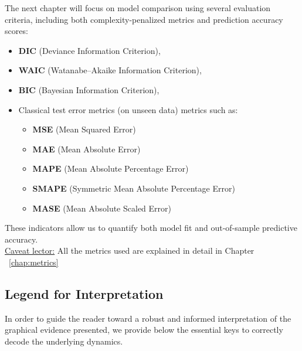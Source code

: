 \documentclass{Configuration_Files/PoliMi3i_thesis}
\begin{document}
The next chapter will focus on model comparison using several evaluation criteria, including both complexity-penalized metrics and prediction accuracy scores:
\begin{itemize}
    \item \textbf{DIC} (Deviance Information Criterion),
    \item \textbf{WAIC} (Watanabe–Akaike Information Criterion),
    \item \textbf{BIC} (Bayesian Information Criterion),
    \item Classical test error metrics (on unseen data) metrics such as:
    \begin{itemize}
  \item \textbf{MSE} (Mean Squared Error)
  \item \textbf{MAE} (Mean Absolute Error)
  \item \textbf{MAPE} (Mean Absolute Percentage Error)
  \item \textbf{SMAPE} (Symmetric Mean Absolute Percentage Error)
  \item \textbf{MASE} (Mean Absolute Scaled Error)
    \end{itemize}
\end{itemize}
These indicators allow us to quantify both model fit and out-of-sample predictive accuracy.\\

\underline{Caveat lector:} All the metrics used are explained in detail in Chapter ~\ref{chap:metrics}

\subsection{Legend for Interpretation}
In order to guide the reader toward a robust and informed interpretation of the graphical evidence presented, we provide below the essential keys to correctly decode the underlying dynamics.
\end{document}
